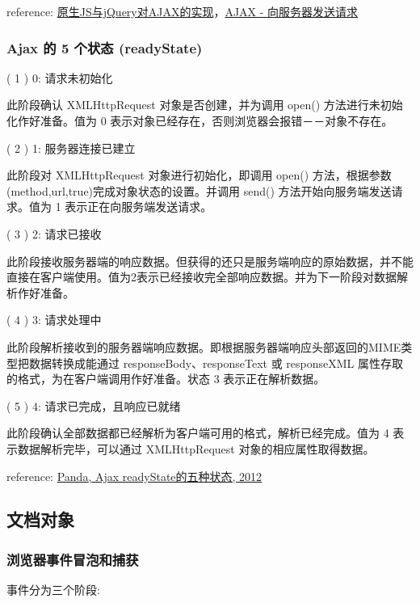 reference: \href{http://segmentfault.com/a/1190000003096293}{原生JS与jQuery对AJAX的实现}，\href{http://www.w3school.com.cn/ajax/ajax\_xmlhttprequest\_send.asp}{AJAX - 向服务器发送请求}

\subsubsection{Ajax 的 5 个状态 (readyState)}\hypertarget{ajax--5--readystate}{}\label{ajax--5--readystate}

( 1 ) 0: 请求未初始化

此阶段确认 XMLHttpRequest 对象是否创建，并为调用 open() 方法进行未初始化作好准备。值为 0 表示对象已经存在，否则浏览器会报错－－对象不存在。

( 2 ) 1: 服务器连接已建立

此阶段对 XMLHttpRequest 对象进行初始化，即调用 open() 方法，根据参数 (method,url,true)完成对象状态的设置。并调用 send() 方法开始向服务端发送请求。值为 1 表示正在向服务端发送请求。

( 3 ) 2: 请求已接收

此阶段接收服务器端的响应数据。但获得的还只是服务端响应的原始数据，并不能直接在客户端使用。值为2表示已经接收完全部响应数据。并为下一阶段对数据解析作好准备。

( 4 ) 3: 请求处理中

此阶段解析接收到的服务器端响应数据。即根据服务器端响应头部返回的MIME类型把数据转换成能通过 responseBody、responseText 或 responseXML 属性存取的格式，为在客户端调用作好准备。状态 3 表示正在解析数据。

( 5 ) 4: 请求已完成，且响应已就绪

此阶段确认全部数据都已经解析为客户端可用的格式，解析已经完成。值为 4 表示数据解析完毕，可以通过 XMLHttpRequest 对象的相应属性取得数据。

reference: \href{http://blog.163.com/freestyle\_le/blog/static/183279448201269112527311/}{Panda, Ajax readyState的五种状态, 2012}

\subsection{文档对象}\hypertarget{section-8}{}\label{section-8}

\subsubsection{浏览器事件冒泡和捕获}\hypertarget{section-9}{}\label{section-9}

事件分为三个阶段:


